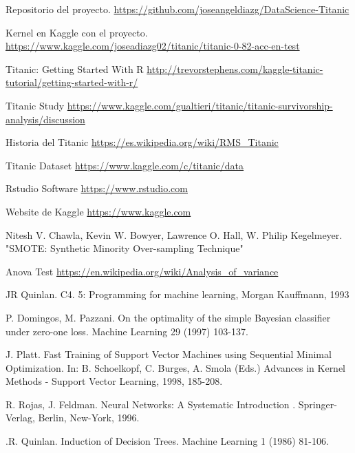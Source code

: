 % 

\begin{thebibliography}{99}


	\emph{} Repositorio del proyecto. \url{https://github.com/joseangeldiazg/DataScience-Titanic}

	\emph{} Kernel en Kaggle con el proyecto. \url{https://www.kaggle.com/joseadiazg02/titanic/titanic-0-82-acc-en-test}

	\emph{} Titanic: Getting Started With R \url{http://trevorstephens.com/kaggle-titanic-tutorial/getting-started-with-r/}
	
	\emph{} Titanic Study \url{https://www.kaggle.com/gualtieri/titanic/titanic-survivorship-analysis/discussion}

	\emph{} Historia del Titanic \url{https://es.wikipedia.org/wiki/RMS_Titanic}

	\emph{} Titanic Dataset \url{https://www.kaggle.com/c/titanic/data}		
	
	\emph{} Rstudio Software \url{https://www.rstudio.com}

	\emph{} Website de Kaggle \url{https://www.kaggle.com}	
	
	
	
	\emph{}Nitesh V. Chawla, Kevin W. Bowyer, Lawrence O. Hall, W. Philip Kegelmeyer. "SMOTE: Synthetic Minority Over-sampling Technique"
	
	\emph{} Anova Test \url{https://en.wikipedia.org/wiki/Analysis_of_variance}
	
	\emph{}JR Quinlan. C4. 5: Programming for machine learning, Morgan Kauffmann, 1993

	\emph{} P. Domingos, M. Pazzani. On the optimality of the simple Bayesian classifier under zero-one loss. Machine Learning 29 (1997) 103-137.

	\emph{} J. Platt. Fast Training of Support Vector Machines using Sequential Minimal Optimization. In: B. Schoelkopf, C. Burges, A. Smola (Eds.) Advances in Kernel Methods - Support Vector Learning, 1998, 185-208.
	
	\emph{} R. Rojas, J. Feldman. Neural Networks: A Systematic Introduction . Springer-Verlag, Berlin, New-York, 1996.
	
	\emph{} .R. Quinlan. Induction of Decision Trees. Machine Learning 1 (1986) 81-106.
				
		
\end{thebibliography}
